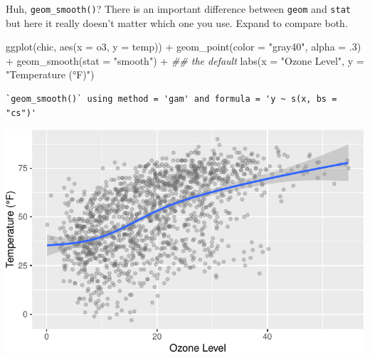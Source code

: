 \documentclass[
  letterpaper,
]{scrbook}
\newenvironment{Shaded}{\begin{snugshade}}{\end{snugshade}}
\newcommand{\AttributeTok}[1]{\textcolor[rgb]{0.40,0.45,0.13}{#1}}
\newcommand{\DecValTok}[1]{\textcolor[rgb]{0.68,0.00,0.00}{#1}}
\newcommand{\DocumentationTok}[1]{\textcolor[rgb]{0.37,0.37,0.37}{\textit{#1}}}
\newcommand{\FunctionTok}[1]{\textcolor[rgb]{0.28,0.35,0.67}{#1}}
\newcommand{\NormalTok}[1]{\textcolor[rgb]{0.00,0.23,0.31}{#1}}
\newcommand{\SpecialCharTok}[1]{\textcolor[rgb]{0.37,0.37,0.37}{#1}}
\newcommand{\StringTok}[1]{\textcolor[rgb]{0.13,0.47,0.30}{#1}}
\begin{document}
\begin{tcolorbox}[enhanced jigsaw, toprule=.15mm, bottomtitle=1mm, coltitle=black, breakable, colbacktitle=quarto-callout-tip-color!10!white, opacityback=0, toptitle=1mm, colframe=quarto-callout-tip-color-frame, titlerule=0mm, title=\textcolor{quarto-callout-tip-color}{\faLightbulb}\hspace{0.5em}{Difference between \texttt{geom} and \texttt{stat}}, bottomrule=.15mm, arc=.35mm, opacitybacktitle=0.6, leftrule=.75mm, left=2mm, rightrule=.15mm, colback=white]

Huh, \texttt{geom\_smooth()}? There is an important difference between
\texttt{geom} and \texttt{stat} but here it really doesn't matter which
one you use. Expand to compare both.

\begin{Shaded}
\begin{Highlighting}[]
\FunctionTok{ggplot}\NormalTok{(chic, }\FunctionTok{aes}\NormalTok{(}\AttributeTok{x =}\NormalTok{ o3, }\AttributeTok{y =}\NormalTok{ temp)) }\SpecialCharTok{+}
  \FunctionTok{geom\_point}\NormalTok{(}\AttributeTok{color =} \StringTok{"gray40"}\NormalTok{, }\AttributeTok{alpha =}\NormalTok{ .}\DecValTok{3}\NormalTok{) }\SpecialCharTok{+}
  \FunctionTok{geom\_smooth}\NormalTok{(}\AttributeTok{stat =} \StringTok{"smooth"}\NormalTok{) }\SpecialCharTok{+} \DocumentationTok{\#\# the default}
  \FunctionTok{labs}\NormalTok{(}\AttributeTok{x =} \StringTok{"Ozone Level"}\NormalTok{, }\AttributeTok{y =} \StringTok{"Temperature (°F)"}\NormalTok{)}
\end{Highlighting}
\end{Shaded}

\begin{verbatim}
`geom_smooth()` using method = 'gam' and formula = 'y ~ s(x, bs = "cs")'
\end{verbatim}

\includegraphics{ch17_files/figure-pdf/geom-stat-smooth-a-1.pdf}


\end{tcolorbox}
\end{document}
